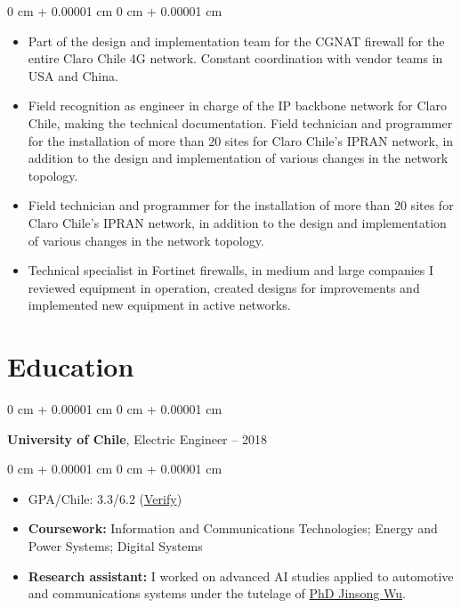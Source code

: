 \documentclass[10pt, letterpaper]{article}
\newenvironment{highlights}{
    \begin{itemize}[
        topsep=0.10 cm,
        parsep=0.10 cm,
        partopsep=0pt,
        itemsep=0pt,
        leftmargin=0 cm + 10pt
    ]
}{
    \end{itemize}
} %
\newenvironment{onecolentry}{
    \begin{adjustwidth}{
        0 cm + 0.00001 cm
    }{
        0 cm + 0.00001 cm
    }
}{
    \end{adjustwidth}
} %
\newenvironment{twocolentry}[2][]{
    \onecolentry
    \def\secondColumn{#2}
    \setcolumnwidth{\fill, 4.5 cm}
    \begin{paracol}{2}
}{
    \switchcolumn \raggedleft \secondColumn
    \end{paracol}
    \endonecolentry
} %
\begin{document}
        \vspace{0.10 cm}
        \begin{onecolentry}
            \begin{highlights}
                \item  Part of the design and implementation team for the CGNAT firewall for the entire Claro Chile 4G network. Constant coordination with vendor teams in USA and China.
                \item Field recognition as engineer in charge of the IP backbone network for Claro Chile, making the technical documentation. Field technician and programmer for the installation of more than 20 sites for Claro Chile's IPRAN network, in addition to the design and implementation of various changes in the network topology.
                \item Field technician and programmer for the installation of more than 20 sites for Claro Chile's IPRAN network, in addition to the design and implementation of various changes in the network topology.
                \item Technical specialist in Fortinet firewalls, in medium and large companies I reviewed equipment in operation, created designs for improvements and implemented new equipment in active networks.
            \end{highlights}
        \end{onecolentry}

    \section{Education}



        
        \begin{twocolentry}{
            2012 – 2018
        }
            \textbf{University of Chile}, Electric Engineer\end{twocolentry}

        \vspace{0.10 cm}
        \begin{onecolentry}
            \begin{highlights}
                \item GPA/Chile: 3.3/6.2 (\href{https://ucampus.uchile.cl/v/6096802252316}{Verify})
                \item \textbf{Coursework:} Information and Communications Technologies; Energy and Power Systems; Digital Systems
                \item \textbf{Research assistant:} I worked on advanced AI studies applied to automotive and communications systems under the tutelage of  \href{https://www.cec.uchile.cl/~jinsongwu/}{PhD Jinsong Wu}.
            \end{highlights}
        \end{onecolentry}
\end{document}
